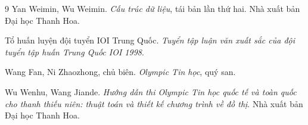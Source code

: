 \documentclass[11pt]{article}
\begin{document}
\begin{thebibliography}{9}
Yan Weimin, Wu Weimin.
\textit{Cấu trúc dữ liệu}, tái bản lần thứ hai.
Nhà xuất bản Đại học Thanh Hoa.

Tổ huấn luyện đội tuyển IOI Trung Quốc.
\textit{Tuyển tập luận văn xuất sắc của đội tuyển tập huấn Trung Quốc IOI 1998}.

Wang Fan, Ni Zhaozhong, chủ biên.
\textit{Olympic Tin học}, quý san.

Wu Wenhu, Wang Jiande.
\textit{Hướng dẫn thi Olympic Tin học quốc tế và toàn quốc cho thanh thiếu niên:
thuật toán và thiết kế chương trình về đồ thị}.
Nhà xuất bản Đại học Thanh Hoa.
\end{thebibliography}
\end{document}
